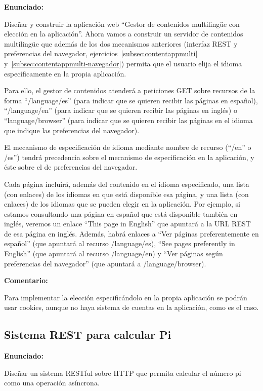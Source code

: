 \textbf{Enunciado:}

Diseñar y construir la aplicación web ``Gestor de contenidos multilingüe con elección en la aplicación''. Ahora vamos a construir un servidor de contenidos multilingüe que además de los dos mecanismos anteriores (interfaz REST y preferencias del navegador, ejercicios~\ref{subsec:contentappmulti} y~\ref{subsec:contentappmulti-navegador}) permita que el usuario elija el idioma específicamente en la propia aplicación.

Para ello, el gestor de contenidos atenderá a peticiones GET sobre recursos de la forma ``/language/es'' (para indicar que se quieren recibir las páginas en español), ``/language/en'' (para indicar que se quieren recibir las páginas en inglés) o ``language/browser'' (para indicar que se quieren recibir las páginas en el idioma que indique las preferencias del navegador).

El mecanismo de especificación de idioma mediante nombre de recurso (``/en'' o /es'') tendrá precedencia sobre el mecanismo de especificación en la aplicación, y éste sobre el de preferencias del navegador.

Cada página incluirá, además del contenido en el idioma especificado, una lista (con enlaces) de los idiomas en que está disponible esa página, y una lista (con enlaces) de los idiomas que se pueden elegir en la aplicación. Por ejemplo, si estamos consultando una página en español que está disponible también en inglés, veremos un enlace ``This page in English'' que apuntará a la URL REST de esa página en inglés. Además, habrá enlaces a ``Ver páginas preferentemente en español'' (que apuntará al recurso /language/es), ``See pages preferently in English'' (que apuntará al recurso /language/en) y ``Ver páginas según preferencias del navegador'' (que apuntará a /language/browser).

\textbf{Comentario:}

Para implementar la elección especificándolo en la propia aplicación se podrán usar cookies, aunque no haya sistema de cuentas en la aplicación, como es el caso.

\subsection{Sistema REST para calcular Pi}
\label{subsec:rest-pi}

\textbf{Enunciado:}

Diseñar un sistema RESTful sobre HTTP que permita calcular el número pi como una operación asíncrona.

